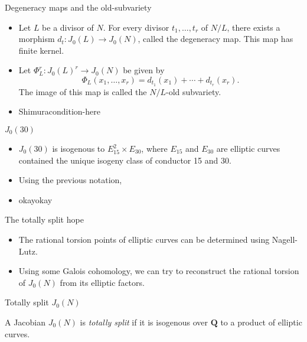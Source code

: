 \documentclass{beamer}
\newcommand{\QQ}{\mathbf{Q}}
\begin{document}
\begin{frame}{Degeneracy maps and the old-subvariety}
    \begin{itemize}
        \item 
            Let $L$ be a divisor of $N$. For every divisor $t_1,\ldots,t_r$ of
            $N/L$, there exists a morphism $d_t:J_0(L)\to J_0(N)$, called the
            degeneracy map. This map has finite kernel.
        \item
            Let $\Phi_L ^r: J_0(L)^r \to J_0(N)$ be given by
            \[
                \Phi_L(x_1,\ldots,x_r)=d_{t_1}(x_1)+\cdots+d_{t_r}(x_r).
            \]
            The image of this map is called the $N/L$-old subvariety.
        \item
            Shimuracondition-here
    \end{itemize}
\end{frame}

\begin{frame}{$J_0(30)$}
    \begin{itemize}
        \item
            $J_0(30)$ is isogenous to $E_{15} ^2\times E_{30}$, where $E_{15}$
            and $E_{30}$ are elliptic curves contained the unique isogeny class
            of conductor 15 and 30.
        \item
            Using the previous notation, 
        \item
            okayokay
    \end{itemize}
\end{frame}

\begin{frame}{The totally split hope}
    \begin{itemize}
        \item 
            The rational torsion points of elliptic curves can be determined
            using Nagell-Lutz.
        \item
            Using some Galois cohomology, we can try to reconstruct the
            rational torsion of $J_0(N)$ from its elliptic factors.
    \end{itemize}
\end{frame}


\begin{frame}{Totally split $J_0(N)$}
    \begin{definition}
        A Jacobian $J_0(N)$ is \emph{totally split} if it is isogenous over
        $\QQ$ to a product of elliptic curves.
    \end{definition}
\end{frame}
\end{document}
